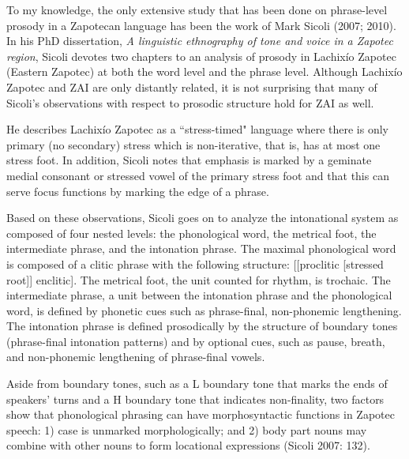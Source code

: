 To my knowledge, the only extensive study that has been done on phrase-level prosody in a Zapotecan language has been the work of Mark Sicoli (2007; 2010). In his PhD dissertation, \textit{A linguistic ethnography of tone and voice in a Zapotec region}, Sicoli devotes two chapters to an analysis of prosody in Lachix\'{i}o Zapotec (Eastern Zapotec) at both the word level and the phrase level. Although Lachix\'{i}o Zapotec and ZAI are only distantly related, it is not surprising that many of Sicoli's observations with respect to prosodic structure hold for ZAI as well. 

He describes Lachix\'{i}o Zapotec as a ``stress-timed" language where there is only primary (no secondary) stress which is non-iterative, that is, has at most one stress foot. In addition, Sicoli notes that emphasis is marked by a geminate medial consonant or stressed vowel of the primary stress foot and that this can serve focus functions by marking the edge of a phrase. 

Based on these observations, Sicoli goes on to analyze the intonational system as composed of four nested levels: the phonological word, the metrical foot, the intermediate phrase, and the intonation phrase. The maximal phonological word is composed of a clitic phrase with the following structure: [[proclitic [stressed root]] enclitic]. The metrical foot, the unit counted for rhythm, is trochaic. The intermediate phrase, a unit between the intonation phrase and the phonological word, is defined by phonetic cues such as phrase-final, non-phonemic lengthening. The intonation phrase is defined prosodically by the structure of boundary tones (phrase-final intonation patterns) and by optional cues, such as pause, breath, and non-phonemic lengthening of phrase-final vowels. 

Aside from boundary tones, such as a L boundary tone that marks the ends of speakers' turns and a H boundary tone that indicates non-finality, two factors show that phonological phrasing can have morphosyntactic functions in Zapotec speech: 1) case is unmarked morphologically; and 2) body part nouns may combine with other nouns to form locational expressions (Sicoli 2007: 132).

